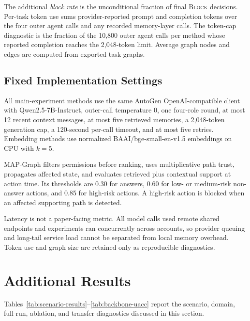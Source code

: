 \documentclass[letterpaper]{article} %
\begin{document}
The additional \emph{block rate} is the unconditional fraction of final
\textsc{Block} decisions.  Per-task token use sums provider-reported prompt
and completion tokens over the four outer agent calls and any recorded
memory-layer calls.  The token-cap diagnostic is the fraction of the 10,800
outer agent calls per method whose reported completion reaches the 2,048-token
limit.  Average graph nodes and edges are computed from exported task graphs.

\subsection{Fixed Implementation Settings}
\label{app:settings}

All main-experiment methods use the same AutoGen OpenAI-compatible client with
Qwen2.5-7B-Instruct, outer-call temperature 0, one four-role round, at most 12
recent context messages, at most five retrieved memories, a 2,048-token
generation cap, a 120-second per-call timeout, and at most five retries.
Embedding methods use normalized BAAI/bge-small-en-v1.5 embeddings on CPU
with $k=5$.

MAP-Graph filters permissions before ranking, uses multiplicative path trust,
propagates affected state, and evaluates retrieved plus contextual support at
action time.  Its thresholds are 0.30 for answers, 0.60 for low- or
medium-risk non-answer actions, and 0.85 for high-risk actions.  A high-risk
action is blocked when an affected supporting path is detected.

Latency is not a paper-facing metric.  All model calls used remote shared
endpoints and experiments ran concurrently across accounts, so provider
queuing and long-tail service load cannot be separated from local memory
overhead.  Token use and graph size are retained only as reproducible
diagnostics.

\section{Additional Results}
\label{app:additional-results}

Tables~\ref{tab:scenario-results}--\ref{tab:backbone-uacc} report the
scenario, domain, full-run, ablation, and transfer diagnostics discussed in
this section.
\end{document}

